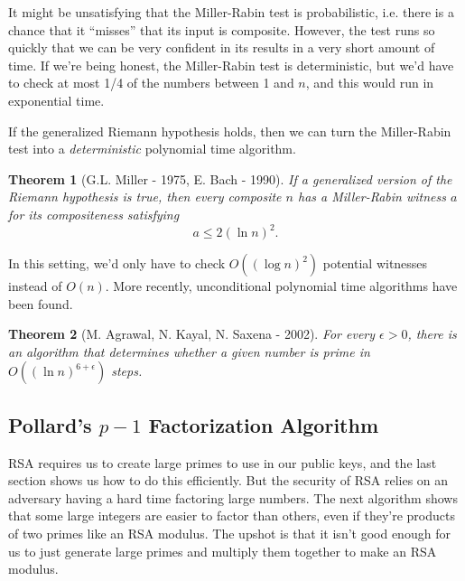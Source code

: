 \documentclass[12pt]{article}
\theoremstyle{plain}
\newtheorem{theorem}{Theorem}[section]
\theoremstyle{definition}
\theoremstyle{remark}
\begin{document}
It might be unsatisfying that the Miller-Rabin test is probabilistic, i.e. there is a chance that it ``misses'' that its input is composite.
However, the test runs so quickly that we can be very confident in its results in a very short amount of time.
If we're being honest, the Miller-Rabin test is deterministic, but we'd have to check at most 1/4 of the numbers between 1 and $n$, and this would run in exponential time.

If the generalized Riemann hypothesis holds, then we can turn the Miller-Rabin test into a \emph{deterministic} polynomial time algorithm.
\begin{theorem}[G.L. Miller - 1975, E. Bach - 1990]
    If a generalized version of the Riemann hypothesis is true, then every composite $n$ has a Miller-Rabin witness $a$ for its compositeness satisfying
    \[
        a \leq 2(\ln n)^2.
    \]
\end{theorem}
In this setting, we'd only have to check $O((\log n)^2)$ potential witnesses instead of $O(n)$.
More recently, unconditional polynomial time algorithms have been found.

\begin{theorem}[M. Agrawal, N. Kayal, N. Saxena - 2002]
    For every $\epsilon > 0$, there is an algorithm that determines whether a given number is prime in $O((\ln n)^{6+\epsilon})$ steps.
\end{theorem}










\subsection{Pollard's $p-1$ Factorization Algorithm}
RSA requires us to create large primes to use in our public keys, and the last section shows us how to do this efficiently.
But the security of RSA relies on an adversary having a hard time factoring large numbers.
The next algorithm shows that some large integers are easier to factor than others, even if they're products of two primes like an RSA modulus.
The upshot is that it isn't good enough for us to just generate large primes and multiply them together to make an RSA modulus.
\end{document}
